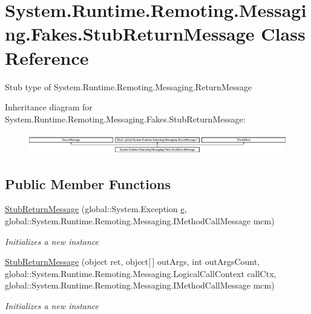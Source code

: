 \hypertarget{class_system_1_1_runtime_1_1_remoting_1_1_messaging_1_1_fakes_1_1_stub_return_message}{\section{System.\-Runtime.\-Remoting.\-Messaging.\-Fakes.\-Stub\-Return\-Message Class Reference}
\label{class_system_1_1_runtime_1_1_remoting_1_1_messaging_1_1_fakes_1_1_stub_return_message}
}


Stub type of System.\-Runtime.\-Remoting.\-Messaging.\-Return\-Message 


Inheritance diagram for System.\-Runtime.\-Remoting.\-Messaging.\-Fakes.\-Stub\-Return\-Message\-:\begin{figure}[H]
\begin{center}
\leavevmode
\includegraphics[height=0.910569cm]{class_system_1_1_runtime_1_1_remoting_1_1_messaging_1_1_fakes_1_1_stub_return_message}
\end{center}
\end{figure}
\subsection*{Public Member Functions}
\begin{DoxyCompactItemize}
\item 
\hyperlink{class_system_1_1_runtime_1_1_remoting_1_1_messaging_1_1_fakes_1_1_stub_return_message_adb58baa238566e0800f7506b0d030f47}{Stub\-Return\-Message} (global\-::\-System.\-Exception \hyperlink{jquery-1_810_82_8min_8js_a2c038346d47955cbe2cb91e338edd7e1}{e}, global\-::\-System.\-Runtime.\-Remoting.\-Messaging.\-I\-Method\-Call\-Message mcm)
\begin{DoxyCompactList}\small\item\em Initializes a new instance\end{DoxyCompactList}\item 
\hyperlink{class_system_1_1_runtime_1_1_remoting_1_1_messaging_1_1_fakes_1_1_stub_return_message_ab861151a53e87b4b480a87d2a7b94b5e}{Stub\-Return\-Message} (object ret, object\mbox{[}$\,$\mbox{]} out\-Args, int out\-Args\-Count, global\-::\-System.\-Runtime.\-Remoting.\-Messaging.\-Logical\-Call\-Context call\-Ctx, global\-::\-System.\-Runtime.\-Remoting.\-Messaging.\-I\-Method\-Call\-Message mcm)
\begin{DoxyCompactList}\small\item\em Initializes a new instance\end{DoxyCompactList}\end{DoxyCompactItemize}
